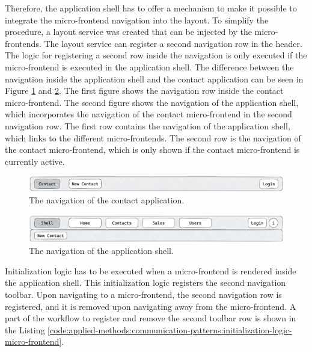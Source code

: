 \noindent Therefore, the application shell has to offer a mechanism to make it possible to integrate the micro-frontend navigation into the layout. To simplify the procedure, a layout service was created that can be injected by the micro-frontends. The layout service can register a second navigation row in the header. The logic for registering a second row inside the navigation is only executed if the micro-frontend is executed in the application shell. The difference between the navigation inside the application shell and the contact application can be seen in Figure \ref{fig:applied-methods:communication-patterns:contact-application-header} and \ref{fig:applied-methods:communication-patterns:application-shell-header}. The first figure shows the navigation row inside the contact micro-frontend. The second figure shows the navigation of the application shell, which incorporates the navigation of the contact micro-frontend in the second navigation row. The first row contains the navigation of the application shell, which links to the different micro-frontends. The second row is the navigation of the contact micro-frontend, which is only shown if the contact micro-frontend is currently active.

\ifshowImages
  \begin{figure}[H]
  \centering
  \includegraphics[width=0.8\linewidth]{images/applied-methods/communication-patterns/contact-header.png}
  \caption{The navigation of the contact application.}\label{fig:applied-methods:communication-patterns:contact-application-header}
  \end{figure}
\fi

\ifshowImages
  \begin{figure}[H]
  \centering
  \includegraphics[width=0.8\linewidth]{images/applied-methods/communication-patterns/host-contact-header.png}
  \caption{The navigation of the application shell.}\label{fig:applied-methods:communication-patterns:application-shell-header}
  \end{figure}
\fi

\noindent Initialization logic has to be executed when a micro-frontend is rendered inside the application shell. This initialization logic registers the second navigation toolbar. Upon navigating to a micro-frontend, the second navigation row is registered, and it is removed upon navigating away from the micro-frontend. A part of the workflow to register and remove the second toolbar row is shown in the Listing \ref{code:applied-methods:communication-patterns:initialization-logic-micro-frontend}.

